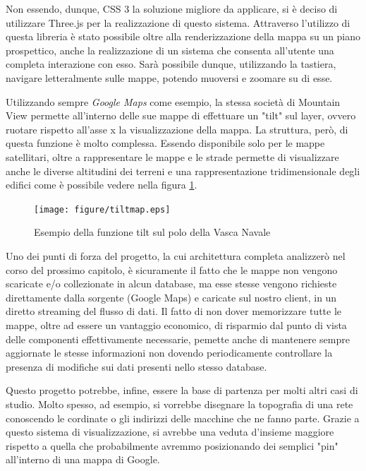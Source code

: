 Non essendo, dunque, CSS 3 la soluzione migliore da applicare, si è deciso di utilizzare Three.js per la realizzazione di questo sistema. Attraverso l'utilizzo di questa libreria è stato possibile oltre alla renderizzazione della mappa su un piano prospettico, anche la realizzazione di un sistema che consenta all'utente una completa interazione con esso. Sarà possibile dunque, utilizzando la tastiera, navigare letteralmente sulle mappe, potendo muoversi e zoomare su di esse.

Utilizzando sempre \textit{Google Maps} come esempio, la stessa società di Mountain View permette all'interno delle sue mappe di effettuare un "tilt" sul layer, ovvero ruotare rispetto all'asse x la visualizzazione della mappa. La struttura, però, di questa funzione è molto complessa. Essendo disponibile solo per le mappe satellitari, oltre a rappresentare le mappe e le strade permette di visualizzare anche le diverse altitudini dei terreni e una rappresentazione tridimensionale degli edifici come è possibile vedere nella figura \ref{fig:tiltmap}.

\begin{figure}[H]
	\centering
	\texttt{[image: figure/tiltmap.eps]}
	\caption{Esempio della funzione tilt sul polo della Vasca Navale}\label{fig:tiltmap}
\end{figure}

Uno dei punti di forza del progetto, la cui architettura completa analizzerò nel corso del prossimo capitolo, è sicuramente il fatto che le mappe non vengono scaricate e/o collezionate in alcun database, ma esse stesse vengono richieste direttamente dalla sorgente (Google Maps) e caricate sul nostro client, in un diretto streaming del flusso di dati. Il fatto di non dover memorizzare tutte le mappe, oltre ad essere un vantaggio economico, di risparmio dal punto di vista delle componenti effettivamente necessarie, pemette anche di mantenere sempre aggiornate le stesse informazioni non dovendo  periodicamente controllare la presenza di modifiche sui dati presenti nello stesso database.

Questo progetto potrebbe, infine, essere la base di partenza per molti altri casi di studio. Molto spesso, ad esempio, si vorrebbe disegnare la topografia di una rete conoscendo le cordinate o gli indirizzi delle macchine che ne fanno parte. Grazie a questo sistema di visualizzazione, si avrebbe una veduta d'insieme maggiore rispetto a quella che probabilmente avremmo posizionando dei semplici "pin" all'interno di una mappa di Google.